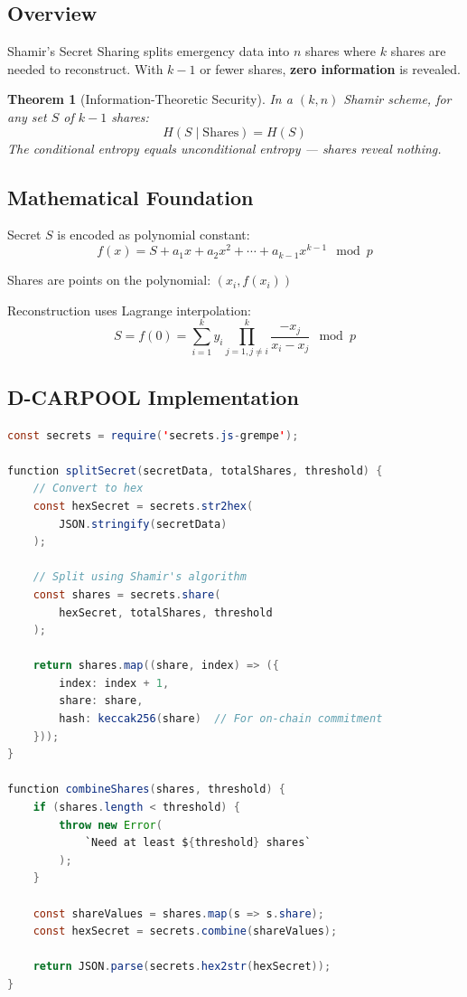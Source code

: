 \documentclass[12pt]{report}
\theoremstyle{plain}
\newtheorem{theorem}{Theorem}[section]
\theoremstyle{definition}
\theoremstyle{remark}
\begin{document}
\subsection{Overview}

Shamir's Secret Sharing splits emergency data into $n$ shares where $k$ shares are needed to reconstruct. With $k-1$ or fewer shares, \textbf{zero information} is revealed.

\begin{theorem}[Information-Theoretic Security]
In a $(k,n)$ Shamir scheme, for any set $S$ of $k-1$ shares:
\begin{equation}
H(S \mid \text{Shares}) = H(S)
\end{equation}
The conditional entropy equals unconditional entropy — shares reveal nothing.
\end{theorem}

\subsection{Mathematical Foundation}

Secret $S$ is encoded as polynomial constant:
\begin{equation}
f(x) = S + a_1x + a_2x^2 + \cdots + a_{k-1}x^{k-1} \mod p
\end{equation}

Shares are points on the polynomial: $(x_i, f(x_i))$

Reconstruction uses Lagrange interpolation:
\begin{equation}
S = f(0) = \sum_{i=1}^{k} y_i \prod_{j=1, j \neq i}^{k} \frac{-x_j}{x_i - x_j} \mod p
\end{equation}

\subsection{D-CARPOOL Implementation}

\begin{lstlisting}[language=Java, caption=Shamir SSS Implementation]
const secrets = require('secrets.js-grempe');

function splitSecret(secretData, totalShares, threshold) {
    // Convert to hex
    const hexSecret = secrets.str2hex(
        JSON.stringify(secretData)
    );
    
    // Split using Shamir's algorithm
    const shares = secrets.share(
        hexSecret, totalShares, threshold
    );
    
    return shares.map((share, index) => ({
        index: index + 1,
        share: share,
        hash: keccak256(share)  // For on-chain commitment
    }));
}

function combineShares(shares, threshold) {
    if (shares.length < threshold) {
        throw new Error(
            `Need at least ${threshold} shares`
        );
    }
    
    const shareValues = shares.map(s => s.share);
    const hexSecret = secrets.combine(shareValues);
    
    return JSON.parse(secrets.hex2str(hexSecret));
}
\end{lstlisting}
\end{document}
